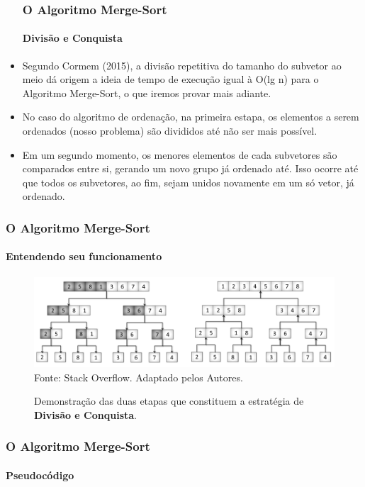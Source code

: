 \documentclass[aspectratio=169]{beamer}
\begin{document}
	\begin{frame}
	\begin{itemize}
		\frametitle{O Algoritmo Merge-Sort}
		\framesubtitle{Divisão e Conquista}
		\item Segundo Cormem (2015), a divisão repetitiva do tamanho do subvetor ao meio dá origem a ideia de tempo de execução igual à O(lg n) para o Algoritmo Merge-Sort, o que iremos provar mais adiante.
		\item No caso do algoritmo de ordenação, na primeira estapa, os elementos a serem ordenados (nosso problema) são divididos até não ser mais possível.
		\item Em um segundo momento, os menores elementos de cada subvetores são comparados entre si, gerando um novo grupo já ordenado até. Isso ocorre até que todos os subvetores, ao fim, sejam unidos novamente em um só vetor, já ordenado.
		
	\end{itemize}
\end{frame}

\begin{frame}
	\frametitle{O Algoritmo Merge-Sort}
	\framesubtitle{Entendendo seu funcionamento}
	\begin{figure}
		\centering
		\caption{Demonstração das duas etapas que constituem a estratégia de\textbf{ Divisão e Conquista}.}
		\includegraphics[width=1\linewidth]{merge2.png}\\
		\footnotesize{Fonte: Stack Overflow. Adaptado pelos Autores.}
		\label{figtextimg}
	\end{figure} 
\end{frame}



	\begin{frame}
	\frametitle{O Algoritmo Merge-Sort}
	\framesubtitle{Pseudocódigo}
	
	\end{frame}
\end{document}
